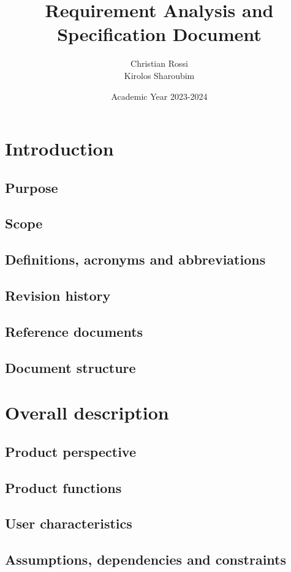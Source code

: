 \documentclass[12pt, a4paper]{report}
\title{Requirement Analysis and Specification Document}
\author{Christian Rossi \\ Kirolos Sharoubim}
\date{Academic Year 2023-2024}
\begin{document}
\maketitle

\newpage

\tableofcontents

\newpage

\chapter{Introduction}
    \section{Purpose}
    \section{Scope}
    \section{Definitions, acronyms and abbreviations}
    \section{Revision history}
    \section{Reference documents}
    \section{Document structure}

\newpage 

\chapter{Overall description}
    \section{Product perspective}
    \section{Product functions}
    \section{User characteristics}
    \section{Assumptions, dependencies and constraints}
\end{document}

